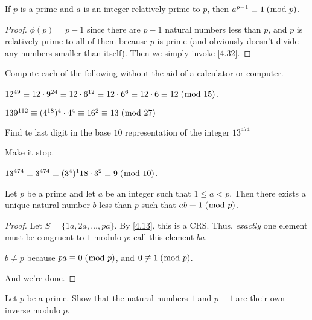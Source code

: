 \documentclass[../main.tex]{subfiles}
\begin{document}
\begin{thm} \label{4.33}
  If $p$ is a prime and $a$ is an integer relatively prime to $p$, then $a^{p-1} \equiv 1 \; (\bmod \; p)$.
\end{thm}

\begin{proof}
  $\phi (p) = p-1$ since there are $p-1$ natural numbers less than $p$, and $p$ is relatively prime to all of them because $p$ is prime (and obviously doesn't divide any numbers smaller than itself). Then we simply invoke \ref{4.32}.
\end{proof}



\begin{ex} \label{4.34}
  Compute each of the following without the aid of a calculator or computer.
\end{ex}

$12^{49} \equiv 12 \cdot 9^{24} \equiv 12 \cdot 6^{12} \equiv 12  \cdot 6^{6} \equiv 12 \cdot 6 \equiv 12 \; (\bmod \; 15)$.

$139^{112} \equiv (4^{18})^4 \cdot 4^4 \equiv 16^2 \equiv 13 \; (\bmod \; 27)$



\begin{ex} \label{4.35}
  Find te last digit in the base $10$ representation of the integer $13^{474}$
\end{ex}

Make it stop.

$13^{474} \equiv 3^{474} \equiv (3^4)^118 \cdot 3^2 \equiv 9 \; (\bmod \; 10)$.



\begin{thm} \label{4.36}
  Let $p$ be a prime and let $a$ be an integer such that $1 \leq a < p$. Then there exists a unique natural number $b$ less than $p$ such that $ab \equiv 1 \; (\bmod \; p)$.
\end{thm}

\begin{proof}
  Let $S = \{1a, 2a, \ldots, pa\}$. By \ref{4.13}, this is a CRS. Thus, \emph{exactly} one element must be congruent to $1$ modulo $p$: call this element $ba$.

  $b \not = p$ because $pa \equiv 0 \; (\bmod \; p)$, and $0 \not \equiv 1 \; (\bmod \; p)$.

  And we're done.
\end{proof}



\begin{ex} \label{4.37}
  Let $p$ be a prime. Show that the natural numbers $1$ and $p-1$ are their own inverse modulo $p$.
\end{ex}
\end{document}
